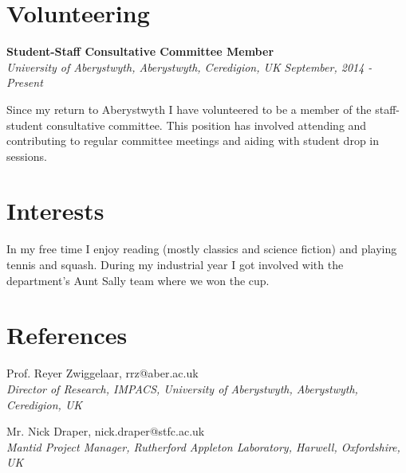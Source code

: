 \documentclass[margin,line]{res}
\begin{document}
\begin{resume}
\section{\sc Volunteering}
{\bf Student-Staff Consultative Committee Member} \\
{\it University of Aberystwyth, Aberystwyth, Ceredigion, UK} \hfill {\it September, 2014 - Present}

Since my return to Aberystwyth I have volunteered to be a member of the staff-student consultative committee. This position has involved attending and contributing to regular committee meetings and aiding with student drop in sessions.

\section{\sc Interests}
In my free time I enjoy reading (mostly classics and science fiction) and playing tennis and squash. During my industrial year I got involved with the department's Aunt Sally team where we won the cup.

\section{\sc References}
Prof. Reyer Zwiggelaar, rrz@aber.ac.uk \\
{\em Director of Research, IMPACS, University of Aberystwyth, Aberystwyth, Ceredigion, UK}

Mr. Nick Draper, nick.draper@stfc.ac.uk \\
{\em Mantid Project Manager, Rutherford Appleton Laboratory, Harwell, Oxfordshire, UK}

\end{resume}
\end{document}
